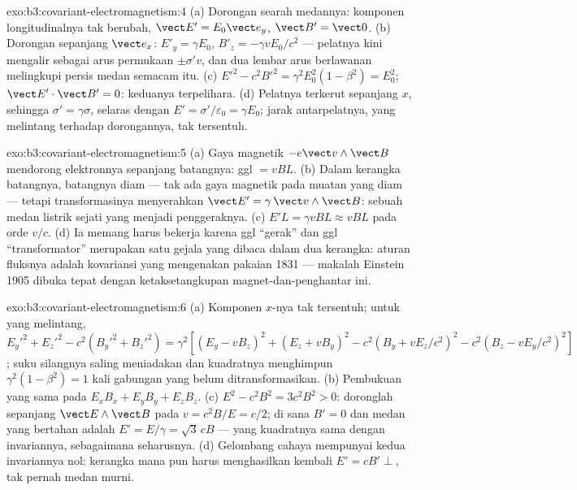\begin{solution}{exo:b3:covariant-electromagnetism:4}
(a) Dorongan searah medannya: komponen longitudinalnya tak berubah, $\vect
E' = E_0\vect e_y$, $\vect B' = \vect 0$. (b) Dorongan sepanjang $\vect
e_x$: $E'_y = \gamma E_0$, $B'_z = -\gamma vE_0/c^2$ --- pelatnya
kini mengalir sebagai arus permukaan $\pm\sigma'v$, dan dua lembar arus
berlawanan melingkupi persis medan semacam itu. (c) $E'^2 - c^2B'^2 =
\gamma^2E_0^2(1 - \beta^2) = E_0^2$; $\vect E'\cdot\vect B' = 0$:
keduanya terpelihara. (d) Pelatnya terkerut sepanjang $x$, sehingga $\sigma' =
\gamma\sigma$, selaras dengan $E' = \sigma'/\varepsilon_0 = \gamma
E_0$; jarak antarpelatnya, yang melintang terhadap dorongannya, tak tersentuh.
\end{solution}

\begin{solution}{exo:b3:covariant-electromagnetism:5}
(a) Gaya magnetik $-e\vect v\wedge\vect B$ mendorong elektronnya
sepanjang batangnya: ggl $= vBL$. (b) Dalam kerangka batangnya, batangnya
diam --- tak ada gaya magnetik pada muatan yang diam --- tetapi
transformasinya menyerahkan $\vect E' = \gamma\,\vect v\wedge\vect B$:
sebuah medan listrik sejati yang menjadi penggeraknya. (c) $E'L = \gamma vBL
\approx vBL$ pada orde $v/c$. (d) Ia memang harus bekerja karena ggl
``gerak'' dan ggl ``transformator'' merupakan satu gejala yang dibaca
dalam dua kerangka: aturan fluksnya adalah kovariansi yang mengenakan
pakaian 1831 --- makalah Einstein 1905 dibuka tepat dengan ketaksetangkupan
magnet-dan-penghantar ini.
\end{solution}

\begin{solution}{exo:b3:covariant-electromagnetism:6}
(a) Komponen $x$-nya tak tersentuh; untuk yang melintang,
$E_y'^2 + E_z'^2 - c^2(B_y'^2 + B_z'^2) = \gamma^2[(E_y - vB_z)^2 +
(E_z + vB_y)^2 - c^2(B_y + vE_z/c^2)^2 - c^2(B_z - vE_y/c^2)^2]$;
suku silangnya saling meniadakan dan kuadratnya menghimpun $\gamma^2(1 -
\beta^2) = 1$ kali gabungan yang belum ditransformasikan. (b) Pembukuan
yang sama pada $E_xB_x + E_yB_y + E_zB_z$. (c) $E^2 - c^2B^2 =
3c^2B^2 > 0$: doronglah sepanjang $\vect E\wedge\vect B$ pada $v = c^2B/E =
c/2$; di sana $B' = 0$ dan medan yang bertahan adalah $E' = E/\gamma =
\sqrt3\,cB$ --- yang kuadratnya sama dengan invariannya, sebagaimana seharusnya. (d) Gelombang cahaya mempunyai kedua invariannya
nol: kerangka mana pun harus menghasilkan kembali $E' = cB' \perp$, tak
pernah medan murni.
\end{solution}

